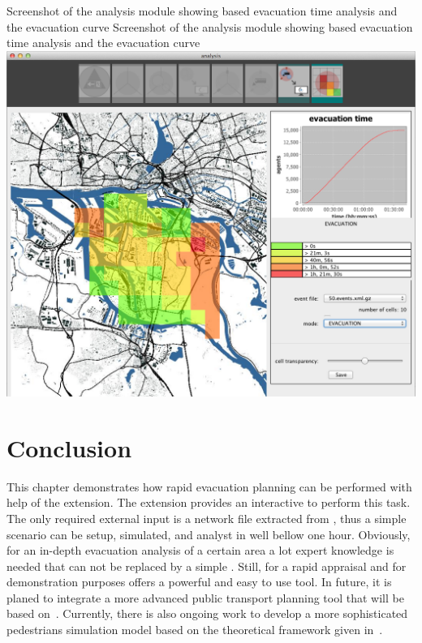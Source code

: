 \createfigure%
{Screenshot of the analysis module showing  based evacuation time analysis and the evacuation curve}%
{Screenshot of the analysis module showing  based evacuation time analysis and the evacuation curve}%
{\label{chap:evac:fig:analysis}}%
{\includegraphics[width=1\textwidth]{extending/figures/Evacuation/it50_evac_time}}
{}

\section{Conclusion}
\label{grips:outlook}
This chapter demonstrates how rapid evacuation planning can be performed with help of the  extension. The  extension provides an interactive  to perform this task.
The only required external input is a network file extracted from , thus a simple scenario can be setup, simulated, and analyst in well bellow one hour. Obviously, for an in-depth evacuation analysis of a certain area a lot expert knowledge is needed that can not be replaced by a simple . Still, for a rapid appraisal and for demonstration purposes  offers a powerful and easy to use tool. In future, it is planed to integrate a more advanced public transport planning tool that will be based on~\citet{Neumann_PhDThesis_2014}. Currently, there is also ongoing work to develop a more sophisticated pedestrians simulation model based on the theoretical framework given in~\citet{FloetteroedLaemmel2014BiPedFnd}.

